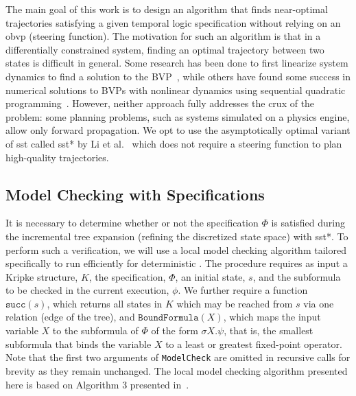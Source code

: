 The main goal of this work is to design an algorithm that finds near-optimal trajectories satisfying a given temporal logic specification without relying on an \gls{obvp} (steering function). The motivation for such an algorithm is that in a differentially constrained system, finding an optimal trajectory between two states is difficult in general. Some research has been done to first linearize system dynamics to find a solution to the BVP~\cite{Webb2013}, while others have found some success in numerical solutions to BVPs with nonlinear dynamics using sequential quadratic programming~\cite{Xie2015}. However, neither approach fully addresses the crux of the problem: some planning problems, such as systems simulated on a physics engine, allow only forward propagation. We opt to use the asymptotically optimal variant of \gls{sst} called \gls{sst}* by Li et al.~\cite{Li2016} which does not require a steering function to plan high-quality trajectories.


\subsection{\texorpdfstring{Model Checking with \muCalc{} Specifications}
                           {Model Checking with mu-Calculus Specifications}}

It is necessary to determine whether or not the \mucalc{} specification $\Phi$ is satisfied during the incremental tree expansion (refining the discretized state space) with \gls{sst}*. To perform such a verification, we will use a local model checking algorithm tailored specifically to run efficiently for deterministic \mucalc{}. The procedure requires as input a Kripke structure, $K$, the \mucalc{} specification, $\Phi$, an initial state, $s$, and the subformula to be checked in the current execution, $\phi$. We further require a function $\texttt{succ}(s)$, which returns all states in $K$ which may be reached from $s$ via one relation (edge of the tree), and $\texttt{BoundFormula}(X)$, which maps the input variable $X$ to the subformula of $\Phi$ of the form $\sigma X.\psi$, that is, the smallest subformula that binds the variable $X$ to a least or greatest fixed-point operator. Note that the first two arguments of \texttt{ModelCheck} are omitted in recursive calls for brevity as they remain unchanged. The local model checking algorithm presented here is based on Algorithm 3 presented in~\cite{Karaman2009}.

